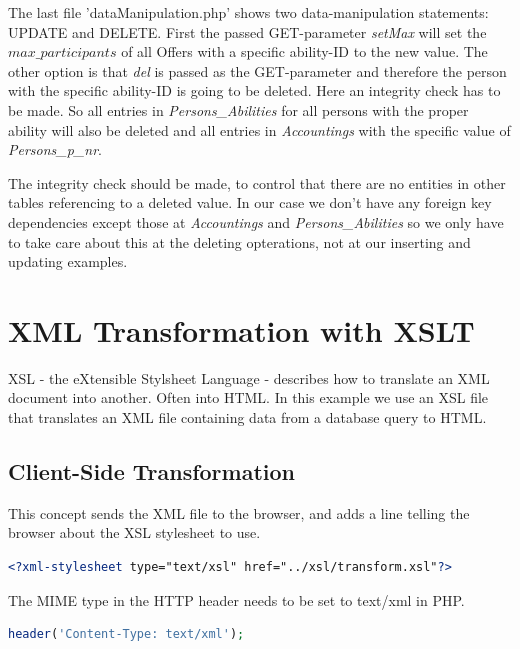 \documentclass[12pt,a4paper,english]{article}
\begin{document}



The last file 'dataManipulation.php' shows two data-manipulation statements: UPDATE and DELETE. First the passed GET-parameter 
\textit{setMax} will set the \textit{$max\_participants$} of all Offers with a specific ability-ID to the new value. \newline
The other option is that \textit{del} is passed as the GET-parameter and therefore the person with the specific ability-ID is going to 
be deleted. Here an integrity check has to be made. So all entries in \textit{Persons_Abilities} for all persons with the proper 
ability will also be deleted and all entries in \textit{Accountings} with the specific value of \textit{Persons_p_nr}.

The integrity check should be made, to control that there are no entities in other tables referencing to a deleted value. In our case 
we don't have any foreign key dependencies except those at \textit{Accountings} and \textit{Persons_Abilities} so we only have to 
take care about this at the deleting opterations, not at our inserting and updating examples.


 
\section{XML Transformation with XSLT} \label{sec:xsl}
XSL - the eXtensible Stylsheet Language - describes how to translate an XML document into another.
Often into HTML. In this example we use an XSL file that translates an XML file containing data
from a database query to HTML.

\subsection{Client-Side Transformation}
This concept sends the XML file to the browser, and adds a line telling the browser about
the XSL stylesheet to use.
\begin{lstlisting}[language=XML]
<?xml-stylesheet type="text/xsl" href="../xsl/transform.xsl"?>
\end{lstlisting}
The MIME type in the HTTP header needs to be set to text/xml in PHP. 
\begin{lstlisting}[language=PHP]
header('Content-Type: text/xml');
\end{lstlisting}
\end{document}
